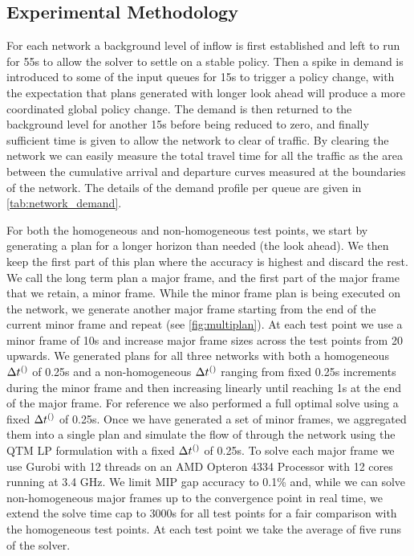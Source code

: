 \subsection{Experimental Methodology}
For each network a background level of inflow is first established and left to run for 55s to allow the solver to settle on a stable policy. Then a spike in demand is introduced to some of the input queues for 15s to trigger a policy change, with the expectation that plans generated with longer look ahead will produce a more coordinated global policy change. The demand is then returned to the background level for another 15s before being reduced to zero, and finally sufficient time is given to allow the network to clear of traffic. By clearing the network we can easily measure the total travel time for all the traffic as the area between the cumulative arrival and departure curves measured at the boundaries of the network. The details of the demand profile per queue are given in \cref{tab:network_demand}.

For both the homogeneous and non-homogeneous test points,
we start by generating a plan for a longer horizon than needed (the look ahead). We then keep the
first part of this plan where the accuracy is highest and discard the
rest. We call the long term plan a major frame, and the first part of the major frame that we retain, a minor frame. While the minor frame
plan is being executed on the network, we generate another major frame starting from the end of the current minor frame and
repeat (see \cref{fig:multiplan}). At each test point we use a minor frame of 10s and increase major frame sizes across the test points from 20 upwards. We generated plans for all three networks with both a homogeneous $\DT[]$ of 0.25s
and a non-homogeneous $\DT[]$ ranging from fixed 0.25s increments
during the minor frame and then increasing linearly until reaching 1s at
the end of the major frame. For reference we also performed a full optimal solve using a
fixed $\DT[]$ of 0.25s. Once we have generated a set of minor
frames, we aggregated them into a single plan and simulate the flow
of through the network using the QTM LP formulation with a fixed $\DT[]$ of 0.25s.
To solve each major frame we use Gurobi with 12 threads on an AMD Opteron 4334 Processor with 12 cores running at 3.4 GHz. We limit MIP gap accuracy to 0.1\% and, while we can solve non-homogeneous major frames up to the convergence point in real time, we extend the solve time cap to 3000s for all test points for a fair comparison with the homogeneous test points. At each test point we take the average of five runs of the solver.

